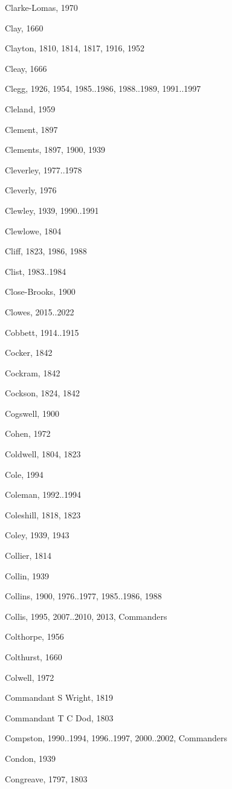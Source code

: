 \begin{theindex}
\item Clarke-Lomas, 1970
\item Clay, 1660
\item Clayton, 1810, 1814, 1817, 1916, 1952
\item Cleay, 1666
\item Clegg, 1926, 1954, 1985..1986, 1988..1989, 1991..1997
\item Cleland, 1959
\item Clement, 1897
\item Clements, 1897, 1900, 1939
\item Cleverley, 1977..1978
\item Cleverly, 1976
\item Clewley, 1939, 1990..1991
\item Clewlowe, 1804
\item Cliff, 1823, 1986, 1988
\item Clist, 1983..1984
\item Close-Brooks, 1900
\item Clowes, 2015..2022
\item Cobbett, 1914..1915
\item Cocker, 1842
\item Cockram, 1842
\item Cockson, 1824, 1842
\item Cogswell, 1900
\item Cohen, 1972
\item Coldwell, 1804, 1823
\item Cole, 1994
\item Coleman, 1992..1994
\item Coleshill, 1818, 1823
\item Coley, 1939, 1943
\item Collier, 1814
\item Collin, 1939
\item Collins, 1900, 1976..1977, 1985..1986, 1988
\item Collis, 1995, 2007..2010, 2013, Commanders
\item Colthorpe, 1956
\item Colthurst, 1660
\item Colwell, 1972
\item Commandant S Wright, 1819
\item Commandant T C Dod, 1803
\item Compston, 1990..1994, 1996..1997, 2000..2002, Commanders
\item Condon, 1939
\item Congreave, 1797, 1803

\end{theindex}
